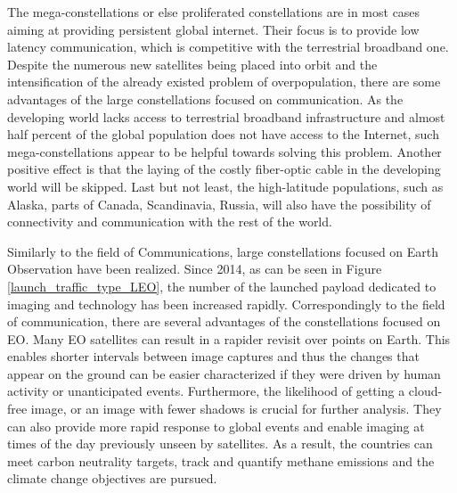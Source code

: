 The mega-constellations or else proliferated constellations are in most cases aiming at providing persistent global internet. Their focus is to provide low latency communication, which is competitive with the terrestrial broadband one. Despite the numerous new satellites being placed into orbit and the intensification of the already existed problem of overpopulation, there are some advantages of the large constellations focused on communication. As the developing world lacks access to terrestrial broadband infrastructure and almost half percent of the global population does not have access to the Internet, such mega-constellations appear to be helpful towards solving this problem. Another positive effect is that the laying of the costly fiber-optic cable in the developing world will be skipped. Last but not least, the high-latitude populations, such as Alaska, parts of Canada, Scandinavia, Russia, will also have the possibility of connectivity and communication with the rest of the world. \cite{Hallex}

Similarly to the field of Communications, large constellations focused on Earth Observation have been realized. Since 2014, as can be seen in Figure \ref{launch_traffic_type_LEO}, the number of the launched payload dedicated to imaging and technology has been increased rapidly. Correspondingly to the field of communication, there are several advantages of the constellations focused on EO. Many EO satellites can result in a rapider revisit over points on Earth. This enables shorter intervals between image captures and thus the changes that appear on the ground can be easier characterized if they were driven by human activity or unanticipated events. Furthermore, the likelihood of getting a cloud-free image, or an image with fewer shadows is crucial for further analysis. They can also provide more rapid response to global events and enable imaging at times of the day previously unseen by satellites. As a result, the countries can meet carbon neutrality targets, track and quantify methane emissions and the climate change objectives are pursued. \cite{LE_Esteve} %

